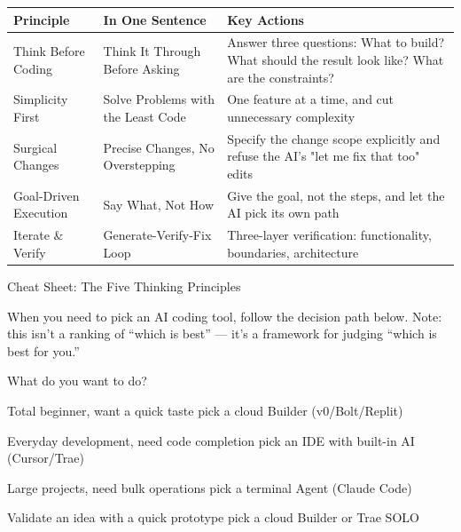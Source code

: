 


\begin{center}
\begin{tabularx}{\linewidth}{|X|X|X|}
\hline
\textbf{Principle} & \textbf{In One Sentence} & \textbf{Key Actions} \tabularnewline
\hline
Think Before Coding & Think It Through Before Asking & Answer three questions: What to build? What should the result look like? What are the constraints? \tabularnewline
Simplicity First & Solve Problems with the Least Code & One feature at a time, and cut unnecessary complexity \tabularnewline
Surgical Changes & Precise Changes, No Overstepping & Specify the change scope explicitly and refuse the AI's "let me fix that too" edits \tabularnewline
Goal-Driven Execution & Say What, Not How & Give the goal, not the steps, and let the AI pick its own path \tabularnewline
Iterate \& Verify & Generate-Verify-Fix Loop & Three-layer verification: functionality, boundaries, architecture \tabularnewline
\hline
\end{tabularx}
\end{center}

\begin{center}\small\color{gray}Cheat Sheet: The Five Thinking Principles\end{center}


When you need to pick an AI coding tool, follow the decision path below. Note: this isn't a ranking of “which is best” — it's a framework for judging “which is best for you.”

What do you want to do?

Total beginner, want a quick taste pick a cloud Builder (v0/Bolt/Replit)

Everyday development, need code completion pick an IDE with built-in AI (Cursor/Trae)

Large projects, need bulk operations pick a terminal Agent (Claude Code)

Validate an idea with a quick prototype pick a cloud Builder or Trae SOLO

